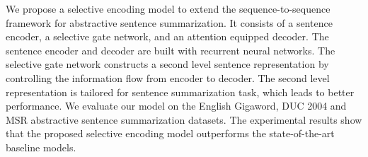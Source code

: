 We propose a selective encoding model to extend the sequence-to-sequence framework for abstractive sentence summarization. It consists of a sentence encoder, a selective gate network, and an attention equipped decoder. The sentence encoder and decoder are built with recurrent neural networks. The selective gate network constructs a second level sentence representation by controlling the information flow from encoder to decoder. The second level representation is tailored for sentence summarization task, which leads to better performance. We evaluate our model on the English Gigaword, DUC 2004 and MSR abstractive sentence summarization datasets. The experimental results show that the proposed selective encoding model outperforms the state-of-the-art baseline models.
